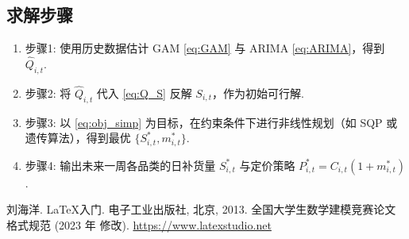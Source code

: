 \documentclass{cumcmthesis}
\begin{document}
\subsection{求解步骤}
\begin{enumerate}
\item 步骤1: 使用历史数据估计 GAM \eqref{eq:GAM} 与 ARIMA \eqref{eq:ARIMA}，得到 $\widehat{Q}_{i,t}$.
\item 步骤2: 将 $\widehat{Q}_{i,t}$ 代入 \eqref{eq:Q_S} 反解 $S_{i,t}$，作为初始可行解.
\item 步骤3: 以 \eqref{eq:obj_simp} 为目标，在约束条件下进行非线性规划（如 SQP 或遗传算法），得到最优 $\{S_{i,t}^*,m_{i,t}^*\}$.
\item 步骤4: 输出未来一周各品类的日补货量 $S_{i,t}^*$ 与定价策略 $P_{i,t}^*=C_{i,t}(1+m_{i,t}^*)$.
\end{enumerate}

\begin{thebibliography}{9}%
    刘海洋.
    \newblock \LaTeX {}入门\allowbreak[J].
    \newblock 电子工业出版社, 北京, 2013.
    全国大学生数学建模竞赛论文格式规范 (2023 年 修改).
     \url{https://www.latexstudio.net}
\end{thebibliography}
\end{document}
